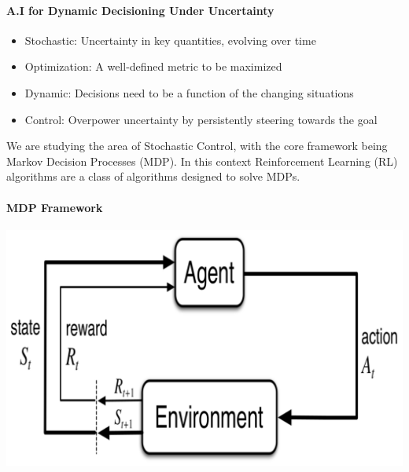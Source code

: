 \documentclass[11pt]{article}
\begin{document}
\maketitle
\thispagestyle{first}

\paragraph*{A.I for Dynamic Decisioning Under Uncertainty}
\begin{itemize}
    \item Stochastic: Uncertainty in key quantities, evolving over time
    \item Optimization: A well-defined metric to be maximized
    \item Dynamic: Decisions need to be a function of the changing situations
    \item Control: Overpower uncertainty by persistently steering towards the goal
\end{itemize}

We are studying the area of Stochastic Control, with the core framework being Markov Decision Processes (MDP). In this context Reinforcement Learning (RL) algorithms are a class of algorithms designed to solve MDPs.

\paragraph*{MDP Framework}
\includegraphics[width=0.5\linewidth]{MDP Framework.png}
\end{document}
